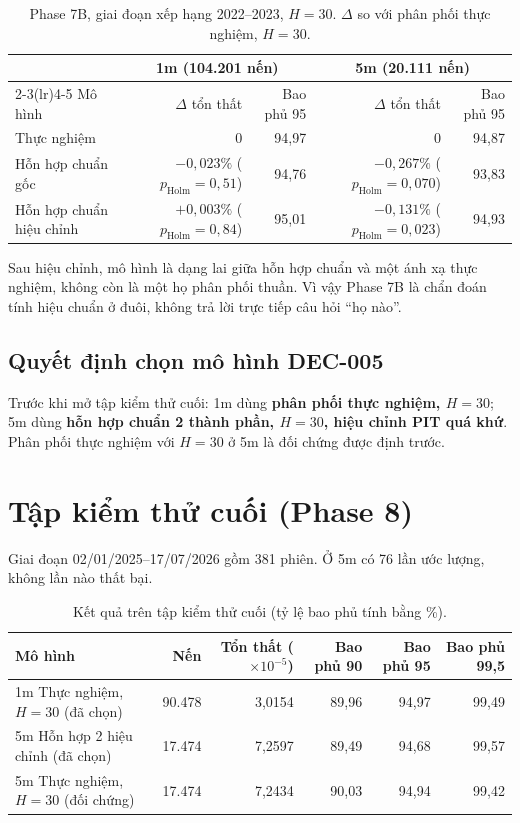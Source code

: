 \documentclass[11pt,a4paper]{article}
\begin{document}
\begin{table}[h]
\centering
\small
\caption{Phase 7B, giai đoạn xếp hạng 2022--2023, $H=30$. $\Delta$ so với phân phối thực nghiệm, $H=30$.}
\begin{tabular}{lrrrr}
\toprule
& \multicolumn{2}{c}{1m (104.201 nến)} & \multicolumn{2}{c}{5m (20.111 nến)} \\
\cmidrule(lr){2-3}\cmidrule(lr){4-5}
Mô hình & $\Delta$ tổn thất & Bao phủ 95 & $\Delta$ tổn thất & Bao phủ 95 \\
\midrule
Thực nghiệm & 0 & 94,97 & 0 & 94,87 \\
Hỗn hợp chuẩn gốc & $-0{,}023\%$ ($p_\text{Holm}=0{,}51$) & 94,76 & $-0{,}267\%$ ($p_\text{Holm}=0{,}070$) & 93,83 \\
Hỗn hợp chuẩn hiệu chỉnh & $+0{,}003\%$ ($p_\text{Holm}=0{,}84$) & 95,01 & $-0{,}131\%$ ($p_\text{Holm}=0{,}023$) & 94,93 \\
\bottomrule
\end{tabular}
\end{table}

Sau hiệu chỉnh, mô hình là dạng lai giữa hỗn hợp chuẩn và một ánh xạ thực nghiệm, không còn là một họ phân phối thuần. Vì vậy Phase 7B là chẩn đoán tính hiệu chuẩn ở đuôi, không trả lời trực tiếp câu hỏi ``họ nào''.

\subsection{Quyết định chọn mô hình DEC-005}

Trước khi mở tập kiểm thử cuối: 1m dùng \textbf{phân phối thực nghiệm, $H=30$}; 5m dùng \textbf{hỗn hợp chuẩn 2 thành phần, $H=30$, hiệu chỉnh PIT quá khứ}. Phân phối thực nghiệm với $H=30$ ở 5m là đối chứng được định trước.

\section{Tập kiểm thử cuối (Phase 8)}

Giai đoạn 02/01/2025--17/07/2026 gồm 381 phiên. Ở 5m có 76 lần ước lượng, không lần nào thất bại.

\begin{table}[h]
\centering
\small
\caption{Kết quả trên tập kiểm thử cuối (tỷ lệ bao phủ tính bằng \%).}
\begin{tabular}{lrrrrr}
\toprule
Mô hình & Nến & Tổn thất ($\times10^{-5}$) & Bao phủ 90 & Bao phủ 95 & Bao phủ 99,5 \\
\midrule
1m Thực nghiệm, $H=30$ (đã chọn) & 90.478 & 3,0154 & 89,96 & 94,97 & 99,49 \\
5m Hỗn hợp 2 hiệu chỉnh (đã chọn) & 17.474 & 7,2597 & 89,49 & 94,68 & 99,57 \\
5m Thực nghiệm, $H=30$ (đối chứng) & 17.474 & 7,2434 & 90,03 & 94,94 & 99,42 \\
\bottomrule
\end{tabular}
\end{table}
\end{document}
